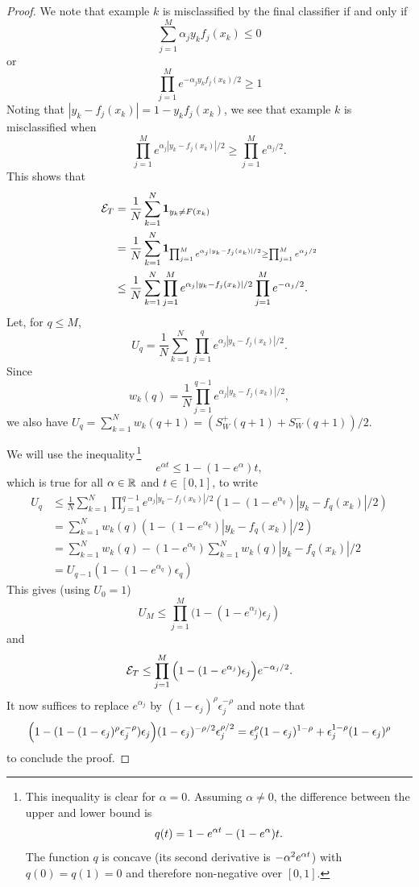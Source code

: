 \begin{proof}
We note that example $k$ is misclassified by the final classifier if and only if
\[
\sum_{j=1}^M \alpha_j y_kf_j(x_k) \leq 0
\]
or
\[
\prod_{j=1}^M e^{-\alpha_j y_k f_j(x_k)/2} \geq 1
\]
Noting that $|y_k - f_j(x_k)| = 1 - y_k f_j(x_k)$, we see that example $k$ is misclassified when
\[
\prod_{j=1}^M e^{\alpha_j |y_k - f_j(x_k)|/2} \geq \prod_{j=1}^M e^{\alpha_j/2}.
\]
This shows that
\begin{align*}
{\mathcal E}_T &= \frac1N  \sum_{k=1}^N {\bm 1}_{y_k\neq F(x_k)}\\
&= \frac1N  \sum_{k=1}^N {\bm 1}_{\prod_{j=1}^M e^{\alpha_j |y_k - f_j(x_k)|/2} \geq \prod_{j=1}^M e^{\alpha_j/2}}\\
&\leq \frac1N  \sum_{k=1}^N \prod_{j=1}^M e^{\alpha_j |y_k - f_j(x_k)|/2}  \prod_{j=1}^M e^{-\alpha_j/2}.
\end{align*}
Let, for $q\leq M$,
\[
U_q = \frac1N  \sum_{k=1}^N \prod_{j=1}^q e^{\alpha_j |y_k - f_j(x_k)|/2}.
\]
Since
\[
w_k(q) =  \frac1N \prod_{j=1}^{q-1} e^{\alpha_j |y_k - f_j(x_k)|/2},
\]
we also have $U_q = \sum_{k=1}^N w_k(q+1) = (S_W^+(q+1) + S_W^-(q+1))/2$.

We will use the inequality\,\footnote{This inequality is clear for $\alpha=0$. Assuming $\alpha\neq 0$,
the difference between the upper and lower bound is
\[
q(t) = 1 - e^{\alpha t} - (1 - e^\alpha)t.
\]
The function $q$ is concave (its second derivative is $-\alpha^2 e^{\alpha t}$) with $q(0) = q(1) = 0$ and therefore non-negative over $[0,1]$. 
} 
\[
e^{\alpha t} \leq 1 - (1-e^\alpha) t, 
\]
which is true for all $\alpha\in{\mathbb{R}}$ and $t\in [0,1]$, to write
\begin{align*}
U_q &\leq  \frac1N  \sum_{k=1}^N \prod_{j=1}^{q-1} e^{\alpha_j |y_k - f_j(x_k)|/2} (1 - (1-e^{\alpha_q})|y_k - f_q(x_k)|/2)\\
&= \sum_{k=1}^{N} w_k(q) (1 - (1-e^{\alpha_q})|y_k - f_q(x_k)|/2)\\
&= \sum_{k=1}^{N} w_k(q)  - (1-e^{\alpha_q})\sum_{k=1}^{N} w_k(q)|y_k - f_q(x_k)|/2\\
&= U_{q-1} (1 - (1-e^{\alpha_q}) \epsilon_q)
\end{align*}
This gives (using $U_0 = 1$)
\[
U_M \leq \prod_{j=1}^M \Big(1 - (1-e^{\alpha_j}\Big) \epsilon_j)
\]
and
\[
{\mathcal E}_T \leq \prod_{j=1}^M \Big(1 - (1-e^{\alpha_j}) \epsilon_j\Big)e^{-\alpha_j/2}.
\]
It now suffices to replace $e^{\alpha_j}$ by $(1-\epsilon_j)^\rho\epsilon_j^{-\rho}$ and note that 
\[
\Big(1 - (1-(1-\epsilon_j)^\rho\epsilon_j^{-\rho}) \epsilon_j\Big)(1-\epsilon_j)^{-\rho/2}\epsilon_j^{\rho/2} = \epsilon_j^\rho(1-\epsilon_j)^{1-\rho} + \epsilon_j^{1-\rho}(1-\epsilon_j)^{\rho}
\]
to conclude the proof.
\end{proof}
